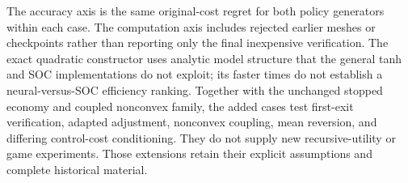 The accuracy axis is the same original-cost regret for both policy generators within each case. The computation axis includes rejected earlier meshes or checkpoints rather than reporting only the final inexpensive verification. The exact quadratic constructor uses analytic model structure that the general tanh and SOC implementations do not exploit; its faster times do not establish a neural-versus-SOC efficiency ranking. Together with the unchanged stopped economy and coupled nonconvex family, the added cases test first-exit verification, adapted adjustment, nonconvex coupling, mean reversion, and differing control-cost conditioning. They do not supply new recursive-utility or game experiments. Those extensions retain their explicit assumptions and complete historical material.
